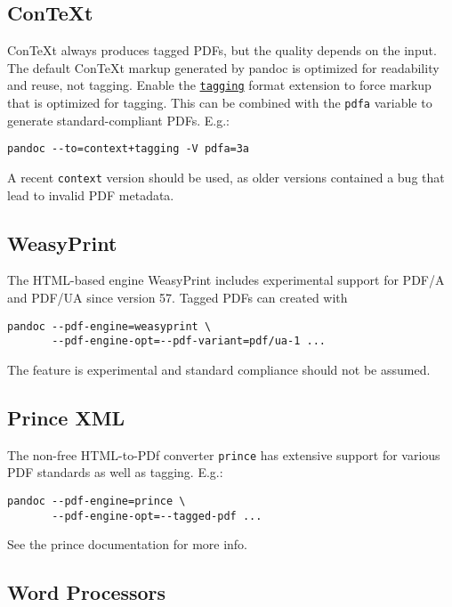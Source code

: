 \documentclass[
  a4paper,
]{article}
\begin{document}
\hypertarget{context}{%
\subsection{ConTeXt}\label{context}}

ConTeXt always produces tagged PDFs, but the quality depends on the
input. The default ConTeXt markup generated by pandoc is optimized for
readability and reuse, not tagging. Enable the
\protect\hyperlink{extension--tagging}{\texttt{tagging}} format
extension to force markup that is optimized for tagging. This can be
combined with the \texttt{pdfa} variable to generate standard-compliant
PDFs. E.g.:

\begin{verbatim}
pandoc --to=context+tagging -V pdfa=3a
\end{verbatim}

A recent \texttt{context} version should be used, as older versions
contained a bug that lead to invalid PDF metadata.

\hypertarget{weasyprint}{%
\subsection{WeasyPrint}\label{weasyprint}}

The HTML-based engine WeasyPrint includes experimental support for PDF/A
and PDF/UA since version 57. Tagged PDFs can created with

\begin{verbatim}
pandoc --pdf-engine=weasyprint \
       --pdf-engine-opt=--pdf-variant=pdf/ua-1 ...
\end{verbatim}

The feature is experimental and standard compliance should not be
assumed.

\hypertarget{prince-xml}{%
\subsection{Prince XML}\label{prince-xml}}

The non-free HTML-to-PDf converter \texttt{prince} has extensive support
for various PDF standards as well as tagging. E.g.:

\begin{verbatim}
pandoc --pdf-engine=prince \
       --pdf-engine-opt=--tagged-pdf ...
\end{verbatim}

See the prince documentation for more info.

\hypertarget{word-processors}{%
\subsection{Word Processors}\label{word-processors}}
\end{document}
